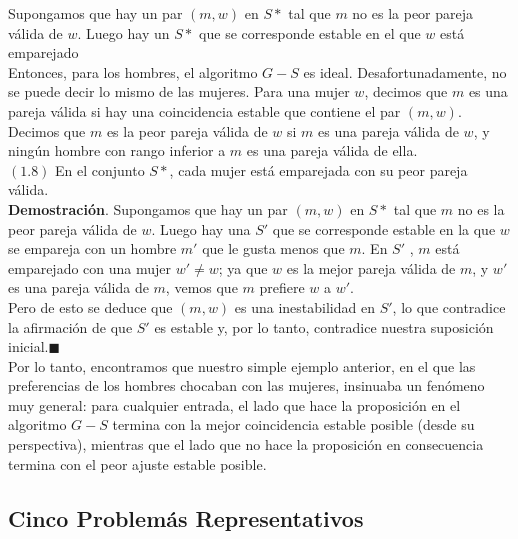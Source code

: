 \documentclass[a4paper]{article}
\begin{document}
Supongamos que hay un par $(m, w)$ en $S*$ tal que $m$ no es la peor pareja válida de $w$. Luego hay un $S*$ que se corresponde estable en el que $w$ está emparejado\\

Entonces, para los hombres, el algoritmo $G-S$ es ideal. Desafortunadamente, no se puede decir lo mismo de las mujeres. Para una mujer $w$, decimos que $m$ es una pareja válida si hay una coincidencia estable que contiene el par $(m, w)$. Decimos que $m$ es la peor pareja válida de $w$ si $m$ es una pareja válida de $w$, y ningún hombre con rango inferior a $m$ es una pareja válida de ella.\\

$(1.8)$ En el conjunto $S*$, cada mujer está emparejada con su peor pareja válida.\\

\textbf{Demostración}. Supongamos que hay un par $(m, w)$ en $S*$ tal que $m$ no es la peor pareja válida de $w$. Luego hay una $S'$ que se corresponde estable en la que $w$ se empareja con un hombre $m'$ que le gusta menos que $m$. En $S'$ , $m$ está emparejado con una mujer $w'≠ w$; ya que $w$ es la mejor pareja válida de $m$, y $w'$ es una pareja válida de $m$, vemos que $m$ prefiere $w$ a $w'$.\\

Pero de esto se deduce que $(m, w)$ es una inestabilidad en $S'$, lo que contradice la afirmación de que $S'$ es estable y, por lo tanto, contradice nuestra suposición inicial.$ \blacksquare $\\

Por lo tanto, encontramos que nuestro simple ejemplo anterior, en el que las preferencias de los hombres chocaban con las mujeres, insinuaba un fenómeno muy general: para cualquier entrada, el lado que hace la proposición en el algoritmo $G-S$ termina con la mejor coincidencia estable posible (desde su perspectiva), mientras que el lado que no hace la proposición en consecuencia termina con el peor ajuste estable posible.\\

\subsection{Cinco Problemás Representativos}
\end{document}
